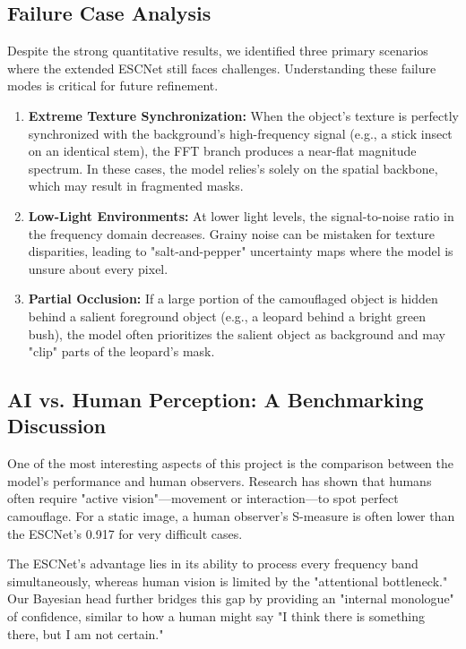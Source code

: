 \documentclass[12pt,a4paper]{report}
\begin{document}
\subsection{Failure Case Analysis}

Despite the strong quantitative results, we identified three primary scenarios where the extended ESCNet still faces challenges. Understanding these failure modes is critical for future refinement.

\begin{enumerate}
    \item \textbf{Extreme Texture Synchronization:} When the object's texture is perfectly synchronized with the background's high-frequency signal (e.g., a stick insect on an identical stem), the FFT branch produces a near-flat magnitude spectrum. In these cases, the model relies's solely on the spatial backbone, which may result in fragmented masks.
    \item \textbf{Low-Light Environments:} At lower light levels, the signal-to-noise ratio in the frequency domain decreases. Grainy noise can be mistaken for texture disparities, leading to "salt-and-pepper" uncertainty maps where the model is unsure about every pixel.
    \item \textbf{Partial Occlusion:} If a large portion of the camouflaged object is hidden behind a salient foreground object (e.g., a leopard behind a bright green bush), the model often prioritizes the salient object as background and may "clip" parts of the leopard's mask.
\end{enumerate}

\subsection{AI vs. Human Perception: A Benchmarking Discussion}

One of the most interesting aspects of this project is the comparison between the model's performance and human observers. Research has shown that humans often require "active vision"—movement or interaction—to spot perfect camouflage. For a static image, a human observer's S-measure is often lower than the ESCNet's 0.917 for very difficult cases.

The ESCNet’s advantage lies in its ability to process every frequency band simultaneously, whereas human vision is limited by the "attentional bottleneck." Our Bayesian head further bridges this gap by providing an "internal monologue" of confidence, similar to how a human might say "I think there is something there, but I am not certain."
\end{document}
